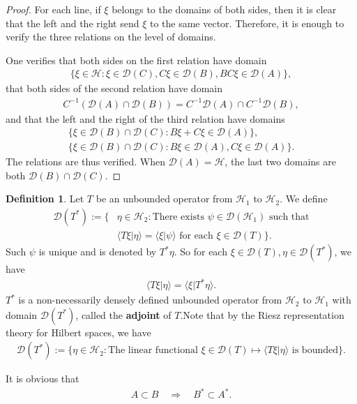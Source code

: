 \documentclass[12pt,b5paper,notitlepage]{article}
\theoremstyle{definition}
\newtheorem{df}{Definition}[section]
\theoremstyle{plain}
\newcommand{\mc}{\mathcal}
\newcommand{\Dom}{\scr D}
\newcommand{\bk}[1]{\langle {#1}\rangle}
\newcommand{\scr}{\mathscr}
\numberwithin{equation}{section}
\begin{document}
\begin{proof}
For each line, if $\xi$ belongs to the domains of both sides, then it is clear that the left and the right send $\xi$ to the same vector. Therefore, it is enough to verify the three relations on the level of domains.

One verifies that both sides on the first relation have domain
\begin{align*}
	\{\xi\in\mc H:\xi\in\Dom(C),C\xi\in\Dom(B),BC\xi\in\Dom(A)\},
\end{align*}
that both sides of the second relation have domain
\begin{align*}
C^{-1}(\Dom(A)\cap\Dom(B))=C^{-1}\Dom(A)\cap C^{-1}\Dom(B),
\end{align*}
and that the left and the right of the third relation have domains
\begin{gather*}
\{\xi\in\Dom(B)\cap\Dom(C):B\xi+C\xi\in\Dom(A)\},\\
\{\xi\in\Dom(B)\cap\Dom(C):B\xi\in\Dom(A),C\xi\in\Dom(A)\}.	
\end{gather*}
The relations are thus verified. When $\scr D(A)=\mc H$, the last two domains are both $\scr D(B)\cap\scr D(C)$.
\end{proof}

\begin{df}
Let $T$ be an unbounded operator from $\mc H_1$ to $\mc H_2$. We define
\begin{align*}
\Dom(T^*):=\{&\eta\in\mc H_2:\text{There exists $\psi\in\Dom(\mc H_1)$ such that}\\
 &\text{$\bk{T\xi|\eta}=\bk{\xi|\psi}$ for each $\xi\in\Dom(T)$}\}.	
\end{align*}
Such $\psi$ is unique and is denoted by $T^*\eta$. So for each $\xi\in\Dom(T),\eta\in\Dom(T^*)$, we have
\begin{align*}
	\bk{T\xi|\eta}=\bk{\xi|T^*\eta}.
\end{align*}
$T^*$ is a non-necessarily densely defined unbounded operator from $\mc H_2$ to $\mc H_1$ with domain $\Dom(T^*)$, called the \textbf{adjoint} of $T$.Note that by the Riesz representation theory for Hilbert spaces, we have
\begin{align}
\Dom(T^*):=\{\eta\in\mc H_2:\text{The linear functional $\xi\in\Dom(T)\mapsto \bk{T\xi|\eta}$ is bounded}\}.\label{eq21}
\end{align}
\end{df}



It is obvious that
\begin{align}
A\subset B\quad\Rightarrow \quad B^*\subset A^*.\label{eq22}
\end{align}
\end{document}
